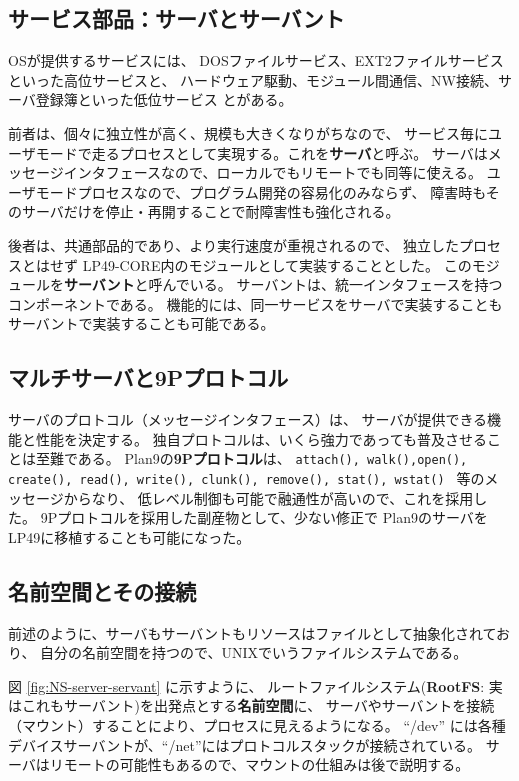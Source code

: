\documentclass{jarticle}
\begin{document}
\subsection{サービス部品：サーバとサーバント}

  OSが提供するサービスには、
  DOSファイルサービス、EXT2ファイルサービスといった高位サービスと、
  ハードウェア駆動、モジュール間通信、NW接続、サーバ登録簿といった低位サービス
  とがある。

  前者は、個々に独立性が高く、規模も大きくなりがちなので、
  サービス毎にユーザモードで走るプロセスとして実現する。これを{\bf サーバ}と呼ぶ。
  サーバはメッセージインタフェースなので、ローカルでもリモートでも同等に使える。
  ユーザモードプロセスなので、プログラム開発の容易化のみならず、
  障害時もそのサーバだけを停止・再開することで耐障害性も強化される。

  後者は、共通部品的であり、より実行速度が重視されるので、
  独立したプロセスとはせず LP49-CORE内のモジュールとして実装することとした。
  このモジュールを{\bf サーバント}と呼んでいる。
  サーバントは、統一インタフェースを持つコンポーネントである。
  機能的には、同一サービスをサーバで実装することもサーバントで実装することも可能である。


\subsection{マルチサーバと9Pプロトコル}

  サーバのプロトコル（メッセージインタフェース）は、
  サーバが提供できる機能と性能を決定する。
  独自プロトコルは、いくら強力であっても普及させることは至難である。
  Plan9の{\bf 9Pプロトコル}は、
  {\tt attach(), walk(),open(), create(), 
  read(), write(), clunk(), remove(), stat(), wstat() }
  等のメッセージからなり、
  低レベル制御も可能で融通性が高いので、これを採用した。
  9Pプロトコルを採用した副産物として、少ない修正で
  Plan9のサーバをLP49に移植することも可能になった。


\subsection{名前空間とその接続}

  前述のように、サーバもサーバントもリソースはファイルとして抽象化されており、
自分の名前空間を持つので、UNIXでいうファイルシステムである。

図 \ref{fig:NS-server-servant} に示すように、
ルートファイルシステム({\bf RootFS}: 実はこれもサーバント)を出発点とする{\bf 名前空間}に、
サーバやサーバントを接続（マウント）することにより、プロセスに見えるようになる。
``/dev'' には各種デバイスサーバントが、``/net''にはプロトコルスタックが接続されている。
サーバはリモートの可能性もあるので、マウントの仕組みは後で説明する。
\end{document}
